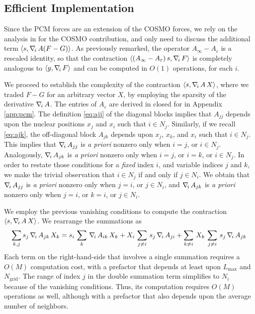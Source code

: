 \subsection{Efficient Implementation}

Since the PCM forces are an extension of the COSMO forces, we rely on the analysis in \cite{Lipparini_JCTC_ddCOSMO} for the COSMO contribution, and only need to discuss the additional term $\langle s , \nabla_{\!i}\,  A ( F - G ) \rangle$. As previously remarked, the operator ${A_\infty} -{A_\varepsilon}$ is a rescaled identity, so that the contraction $\langle ({A_\infty}-{A_\varepsilon})\, s, \nabla_{\!i}\, F \rangle$ is completely analogous to $\langle y , \nabla_{\!i}\, F \rangle$ and can be computed in $O(1)$ operations, for each $i$.
 
 
We proceed to establish the complexity of the contraction $\langle s , \nabla_{\!i}\,  A\, X \rangle$, where we traded $F-G$ for an arbitrary vector $X$, by employing the sparsity of the derivative $\nabla_{\!i}\, A$. The entries of $A_\varepsilon$ are derived in closed for in Appendix \ref{app:pcm}. The definition \eqref{eq:ajj} of the diagonal blocks implies that $A_{jj}$ depends upon the nuclear positions $x_j$ and $x_i$ such that $i \in N_j$. Similarly, if we recall \eqref{eq:ajk}, the off-diagonal block $A_{jk}$ depends upon $x_j$, $x_k$, and $x_i$ such that $i \in N_j$. This implies that $\nabla_{\!i}\, A_{jj}$ is \emph{a priori} nonzero only when $i = j$, or $i \in N_j$. Analogously, $\nabla_{\!i}\, A_{jk}$ is \emph{a priori} nonzero only when $i = j$, or $i = k$, or $i \in N_j$. In order to restate those conditions for a \emph{fixed} index $i$, and variable indices $j$ and $k$, we make the trivial observation that $i \in N_j$ if and only if $j \in N_i$. We obtain that $\nabla_{\!i}\, A_{jj}$ is \emph{a priori} nonzero only when $j = i$, or $j \in N_i$, and $\nabla_{\!i}\, A_{jk}$ is \emph{a priori} nonzero only when $j= i$, or $k = i$, or $j \in N_i$.

We employ the previous vanishing conditions to compute the contraction $\langle s , \nabla_{\!i}\, A\,X \rangle$. We rearrange the summations as
\[
\sum_{k,j} s_j \, \nabla_{\!i}\, A_{jk} \, X_k =  s_i \, \sum_k \, \nabla_{\!i}\, A_{ik} \, X_k + X_i \, \sum_{j \not=i} \, s_j \, \nabla_{\!i}\, A_{ji}  + \sum_{k\not=i} \,X_k \,\sum_{j\not=i} \, s_j \, \nabla_{\!i}\, A_{jk}
\]
Each term on the right-hand-side that involves a single summation requires a $O(M)$ computation cost, with a prefactor that depends at least upon $L_\text{max}$ and $N_\text{grid}$. The range of index $j$ in the double summation term simplifies to $N_i$ because of the vanishing conditions. Thus, its computation requires $O(M)$ operations as well, although with a prefactor that also depends upon the average number of neighbors.

